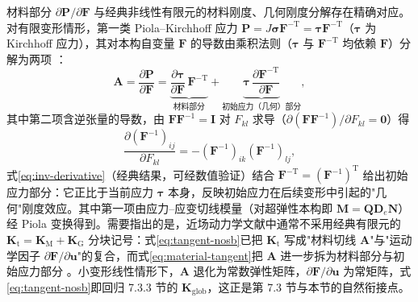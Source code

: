 \begin{remark}
  材料部分 $\partial\mathbf{P}/\partial\mathbf{F}$ 与经典非线性有限元的材料刚度、几何刚度分解存在精确对应。对有限变形情形，第一类 Piola--Kirchhoff 应力 $\mathbf{P}=J\boldsymbol{\sigma}\mathbf{F}^{-\mathrm{T}}=\boldsymbol{\tau}\mathbf{F}^{-\mathrm{T}}$（$\boldsymbol{\tau}$ 为 Kirchhoff 应力），其对本构自变量 $\mathbf{F}$ 的导数由乘积法则（$\boldsymbol{\tau}$ 与 $\mathbf{F}^{-\mathrm{T}}$ 均依赖 $\mathbf{F}$）分解为两项 \cite{Hashim2020}：
  \begin{equation}
    \mathbf{A}=\frac{\partial\mathbf{P}}{\partial\mathbf{F}}
    =\underbrace{\frac{\partial\boldsymbol{\tau}}{\partial\mathbf{F}}\,\mathbf{F}^{-\mathrm{T}}}_{\text{材料部分}}
     +\underbrace{\boldsymbol{\tau}\,\frac{\partial\mathbf{F}^{-\mathrm{T}}}{\partial\mathbf{F}}}_{\text{初始应力（几何）部分}},
    \label{eq:material-tangent}
  \end{equation}
  其中第二项含逆张量的导数，由 $\mathbf{F}\mathbf{F}^{-1}=\mathbf{I}$ 对 $F_{kl}$ 求导（$\partial(\mathbf{F}\mathbf{F}^{-1})/\partial F_{kl}=\mathbf{0}$）得
  \begin{equation}
    \frac{\partial(\mathbf{F}^{-1})_{ij}}{\partial F_{kl}}
    =-(\mathbf{F}^{-1})_{ik}(\mathbf{F}^{-1})_{lj},
    \label{eq:inv-derivative}
  \end{equation}
  式\eqref{eq:inv-derivative}（经典结果，可经数值验证）结合 $\mathbf{F}^{-\mathrm{T}}=(\mathbf{F}^{-1})^{\mathrm{T}}$ 给出初始应力部分：它正比于当前应力 $\boldsymbol{\tau}$ 本身，反映初始应力在后续变形中引起的"几何"刚度效应。其中第一项由应力--应变切线模量（对超弹性本构即 $\mathbf{M}=\mathbf{Q}\mathbf{D}_{e}\mathbf{N}$）经 Piola 变换得到。需要指出的是，近场动力学文献中通常不采用经典有限元的 $\mathbf{K}_{\mathrm{t}}=\mathbf{K}_{\mathrm{M}}+\mathbf{K}_{\mathrm{G}}$ 分块记号：式\eqref{eq:tangent-nosb}已把 $\mathbf{K}_{\mathrm{t}}$ 写成"材料切线 $\mathbf{A}$"与"运动学因子 $\partial\mathbf{F}/\partial\mathbf{u}$"的复合，而式\eqref{eq:material-tangent}把 $\mathbf{A}$ 进一步拆为材料部分与初始应力部分 \cite{Hashim2020}。小变形线性情形下，$\mathbf{A}$ 退化为常数弹性矩阵，$\partial\mathbf{F}/\partial\mathbf{u}$ 为常矩阵，式\eqref{eq:tangent-nosb}即回归 7.3.3 节的 $\mathbf{K}_{\mathrm{glob}}$，这正是第 7.3 节与本节的自然衔接点。
\end{remark}

